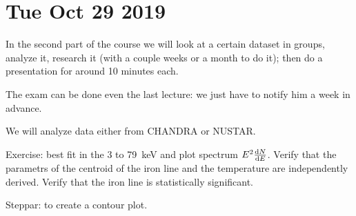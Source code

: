 \documentclass[main.tex]{subfiles}
\begin{document}
\section*{Tue Oct 29 2019}

In the second part of the course we will look at a certain dataset in groups, analyze it, research it (with a couple weeks or a month to do it); then do a presentation for around 10 minutes each.

The exam can be done even the last lecture: we just have to notify him a week in advance.

We will analyze data either from CHANDRA or NUSTAR.

Exercise: best fit in the 3 to \SI{79}{keV} and plot spectrum \(E^2 \dv{N}{E}\).
Verify that the parametrs of the centroid of the iron line and the temperature are independently derived.
Verify that the iron line is statistically significant. 

Steppar: to create a contour plot.
\end{document}
